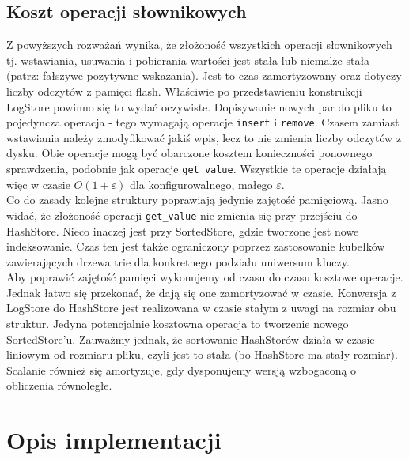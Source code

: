 \documentclass[declaration,shortabstract,masc]{iithesis}
\begin{document}
		\section{Koszt operacji słownikowych}
			Z powyższych rozważań wynika, że złożoność wszystkich operacji słownikowych tj. wstawiania, usuwania i pobierania wartości jest stała lub niemalże stała (patrz: fałszywe pozytywne wskazania). Jest to czas zamortyzowany oraz dotyczy liczby odczytów z pamięci flash. Właściwie po przedstawieniu konstrukcji LogStore powinno się to wydać oczywiste. Dopisywanie nowych par do pliku to pojedyncza operacja - tego wymagają operacje \texttt{insert} i \texttt{remove}. Czasem zamiast wstawiania należy zmodyfikować jakiś wpis, lecz to nie zmienia liczby odczytów z dysku. Obie operacje mogą być obarczone kosztem konieczności ponownego sprawdzenia, podobnie jak operacje \texttt{get\_value}. Wszystkie te operacje działają więc w czasie $O(1+\varepsilon)$ dla konfigurowalnego, małego $\varepsilon$.\\
			\indent Co do zasady kolejne struktury poprawiają jedynie zajętość pamięciową. Jasno widać, że złożoność operacji \texttt{get\_value} nie zmienia się przy przejściu do HashStore. Nieco inaczej jest przy SortedStore, gdzie tworzone jest nowe indeksowanie. Czas ten jest także ograniczony poprzez zastosowanie kubełków zawierających drzewa trie dla konkretnego podziału uniwersum kluczy.\\
			\indent Aby poprawić zajętość pamięci wykonujemy od czasu do czasu kosztowe operacje. Jednak łatwo się przekonać, że dają się one zamortyzować w czasie. Konwersja z LogStore do HashStore jest realizowana w czasie stałym z uwagi na rozmiar obu struktur. Jedyna potencjalnie kosztowna operacja to tworzenie nowego SortedStore'u. Zauważmy jednak, że sortowanie HashStorów działa w czasie liniowym od rozmiaru pliku, czyli jest to stała (bo HashStore ma stały rozmiar). Scalanie również się amortyzuje, gdy dysponujemy wersją wzbogaconą o obliczenia równoległe.
	\chapter{Opis implementacji}
\end{document}
